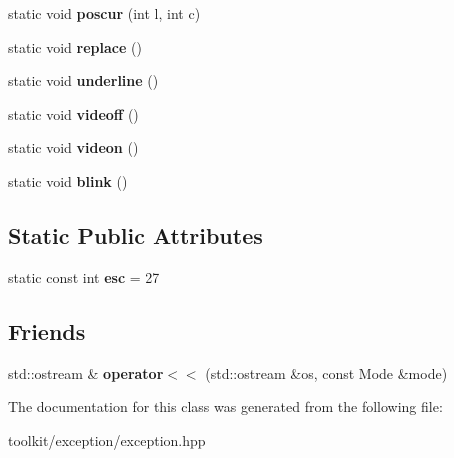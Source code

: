 \begin{DoxyCompactItemize}
\item 
\hypertarget{classConsole_a00f6a2d90f6788226f7640fbdc399be9}{
static void {\bfseries poscur} (int l, int c)}
\label{classConsole_a00f6a2d90f6788226f7640fbdc399be9}

\item 
\hypertarget{classConsole_a8bbc999f5c03ee649261f395113f3327}{
static void {\bfseries replace} ()}
\label{classConsole_a8bbc999f5c03ee649261f395113f3327}

\item 
\hypertarget{classConsole_acdbffad9e6d5faf3654f2f662a885c05}{
static void {\bfseries underline} ()}
\label{classConsole_acdbffad9e6d5faf3654f2f662a885c05}

\item 
\hypertarget{classConsole_a0c0b82ca8465e8d07d1c1000fd1c7065}{
static void {\bfseries videoff} ()}
\label{classConsole_a0c0b82ca8465e8d07d1c1000fd1c7065}

\item 
\hypertarget{classConsole_a9452e745b8255bfc5c01914e284a6dde}{
static void {\bfseries videon} ()}
\label{classConsole_a9452e745b8255bfc5c01914e284a6dde}

\item 
\hypertarget{classConsole_a0d4128ee5041ea69f58cbb0d200a2f80}{
static void {\bfseries blink} ()}
\label{classConsole_a0d4128ee5041ea69f58cbb0d200a2f80}

\end{DoxyCompactItemize}
\subsection*{Static Public Attributes}
\begin{DoxyCompactItemize}
\item 
\hypertarget{classConsole_abf80bf3470dade29c45fed14ee6e9d38}{
static const int {\bfseries esc} = 27}
\label{classConsole_abf80bf3470dade29c45fed14ee6e9d38}

\end{DoxyCompactItemize}
\subsection*{Friends}
\begin{DoxyCompactItemize}
\item 
\hypertarget{classConsole_aff1b0921f7ab18e456bfb58711afdaea}{
std::ostream \& {\bfseries operator$<$$<$} (std::ostream \&os, const Mode \&mode)}
\label{classConsole_aff1b0921f7ab18e456bfb58711afdaea}

\end{DoxyCompactItemize}


The documentation for this class was generated from the following file:\begin{DoxyCompactItemize}
\item 
toolkit/exception/exception.hpp\end{DoxyCompactItemize}
